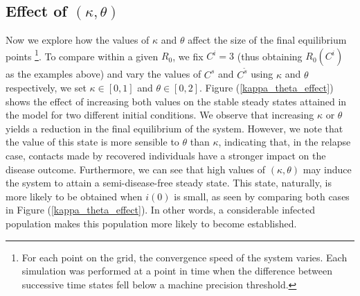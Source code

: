 \documentclass[sn-basic]{sn-jnl}%
\theoremstyle{thmstyleone}%
\theoremstyle{thmstyletwo}%
\theoremstyle{thmstylethree}%
\newcommand{\ws}{\widetilde{s}}
\begin{document}
\subsection{Effect of \texorpdfstring{$(\kappa, \theta)$}{}}

Now we explore how the values of $\kappa$ and $\theta$ affect the size of the final equilibrium points \footnote{For each point on the grid, the convergence speed of the system varies. Each simulation was performed at a point in time when the difference between successive time states fell below a machine precision threshold.}. To compare within a given $R_0$, we fix $C^i=3$ (thus obtaining $R_0(C^i)$ as the examples above) and vary the values of $C^s$ and $C^{\ws}$ using $\kappa$ and $\theta$ respectively, we set $\kappa \in [0,1]$ and $\theta \in [0,2]$. Figure (\ref{kappa_theta_effect}) shows the effect of increasing both values on the stable steady states attained in the model for two different initial conditions. We observe that increasing $\kappa$ or $\theta$ yields a reduction in the final equilibrium of the system. However, we note that the value of this state is more sensible to $\theta$ than $\kappa$, indicating that, in the relapse case, contacts made by recovered individuals have a stronger impact on the disease outcome. Furthermore, we can see that high values of $(\kappa, \theta)$ may induce the system to attain a semi-disease-free steady state. This state, naturally, is more likely to be obtained when $i(0)$ is small, as seen by comparing both cases in Figure (\ref{kappa_theta_effect}). In other words, a considerable infected population makes this population more likely to become established.
\end{document}
